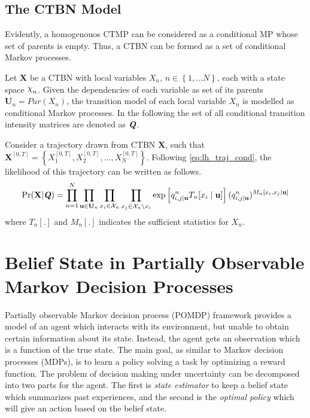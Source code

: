 \subsection{The CTBN Model}
Evidently, a homogenouos CTMP can be considered as a conditional MP whose set of parents is empty. Thus, a CTBN can be formed as a set of conditional Markov processes.

Let \textbf{X} be a CTBN with local variables $ X_n $, $ n \in \left\lbrace 1,...N \right\rbrace $, each with a state space $ \rchi_n $. Given the dependencies of each variable as set of its parents $ \textbf{U}_n = Par(X_n) $, the transition model of each local variable $ X_n $ is modelled as conditional Markov processes. \cite{Nodelman1995} In the following the set of all conditional transition intensity matrices are denoted as $ \textbf{\textit{Q}} $.

Consider a trajectory drawn from CTBN $ \textbf{X} $, such that $ \textbf{X}^{[0, T]} = \left\lbrace X_1^{[0,T]},  X_2^{[0,T]}, ...,  X_N^{[0,T]}\right\rbrace  $. Following \autoref{eq:lh_traj_cond}, the likelihood of this trajectory can be written as follows.
\begin{align}
\operatorname{Pr}( \textbf{X}  | \textbf{\textit{Q}} ) = \prod_{n=1}^{N} \prod_{\textbf{u} \in \mathcal{\textbf{U}}_{n}} \prod_{x_i \in \mathcal{X}_{n}} \prod_{x_j \in \mathcal{X}_{n} \backslash x_i}
\exp \left[q_{i,j\mid \textbf{u}}^{n} T_{n}[x_i\mid \textbf{u}]\right] (q_{i,j\mid \textbf{u}}^{n})^{M_{n}[x_i, x_j\mid \textbf{u}]}
\label{eq:lh_CTBN}
\end{align}
where $ T_n[.] $ and $ M_n[.] $ indicates the sufficient statistics for $ X_n $.

\section{Belief State in Partially Observable Markov Decision Processes}
\label{sec:belief_POMDP}
Partially observable Markov decision process (POMDP) framework provides a model of an agent which interacts with its environment, but unable to obtain certain information about its state. Instead, the agent gets an observation which is a function of the true state. The main goal, as similar to Markov decision processes (MDPs), is to learn a policy solving a task by optimizing a reward function. The problem of decision making under uncertainty can be decomposed into two parts for the agent. The first is \textit{state estimator} to keep a belief state which summarizes past experiences, and the second is the \textit{optimal policy} which will give an action based on the belief state. \cite{Murphy2000,KAELBLING199899}

